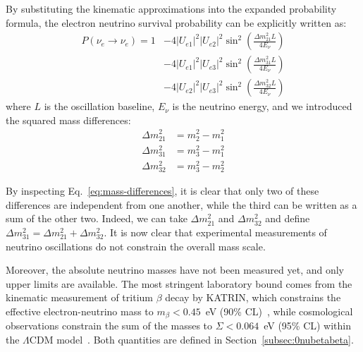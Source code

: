 By substituting the kinematic approximations into the expanded probability formula, the electron neutrino survival probability can be explicitly written as:
\begin{equation}
    \label{eq:P_ee_main}
    \begin{aligned}
        P(\nu_e \to \nu_e) = 1 &- 4 |U_{e1}|^2|U_{e2}|^2 \sin^2\left(\frac{\Delta m^2_{21} L}{4E_\nu}\right) \\
        &- 4 |U_{e1}|^2|U_{e3}|^2 \sin^2\left(\frac{\Delta m^2_{31} L}{4E_\nu}\right) \\
        &- 4 |U_{e2}|^2|U_{e3}|^2 \sin^2\left(\frac{\Delta m^2_{32} L}{4E_\nu}\right)
    \end{aligned}
\end{equation}
where $L$ is the oscillation baseline, $E_\nu$ is the neutrino energy, and we introduced the squared mass differences:
\begin{equation}
    \label{eq:mass-differences}
    \begin{aligned}
        \Delta m^2_{21} &= m^2_2 - m^2_1 \\
        \Delta m^2_{31} &= m^2_3 - m^2_1 \\
        \Delta m^2_{32} &= m^2_3 - m^2_2 
    \end{aligned}
\end{equation}

By inspecting Eq.~\ref{eq:mass-differences}, it is clear that only two of these differences are independent from one another, while the third can be written as a sum of the other two. Indeed, we can take $\Delta m^2_{21}$ and $\Delta m^2_{32}$ and define $\Delta m^2_{31} = \Delta m^2_{21} + \Delta m^2_{32}$. It is now clear that experimental measurements of neutrino oscillations do not constrain the overall mass scale.

Moreover, the absolute neutrino masses have not been measured yet, and only upper limits are available. The most stringent laboratory bound comes from the kinematic measurement of tritium $\beta$ decay by KATRIN, which constrains the effective electron-neutrino mass to $m_\beta < 0.45$~eV (90\% CL)~\cite{katrin2025}, while cosmological observations constrain the sum of the masses to $\Sigma < 0.064$~eV (95\% CL) within the $\Lambda$CDM model~\cite{desi2025}. Both quantities are defined in Section~\ref{subsec:0nubetabeta}.

